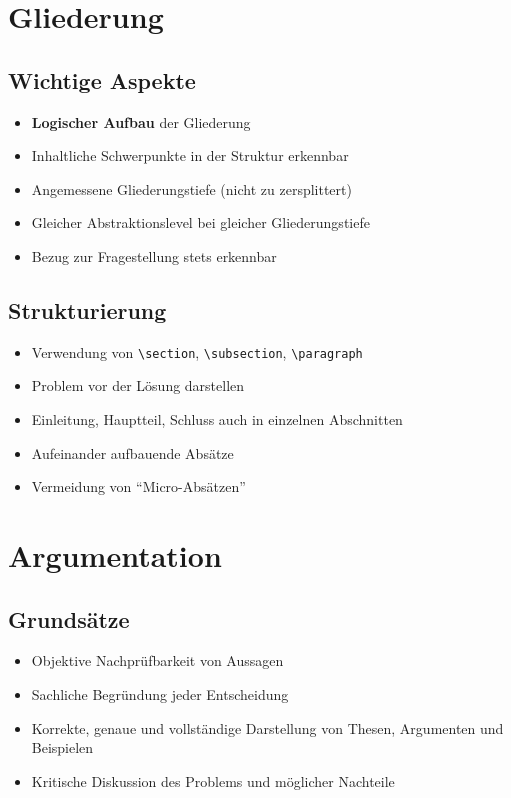 \documentclass[a4paper,12pt]{article}
\begin{document}
\section{Gliederung}

\subsection{Wichtige Aspekte}
\begin{itemize}
    \item \textbf{Logischer Aufbau} der Gliederung
    \item Inhaltliche Schwerpunkte in der Struktur erkennbar
    \item Angemessene Gliederungstiefe (nicht zu zersplittert)
    \item Gleicher Abstraktionslevel bei gleicher Gliederungstiefe
    \item Bezug zur Fragestellung stets erkennbar
\end{itemize}

\subsection{Strukturierung}
\begin{itemize}
    \item Verwendung von \verb|\section|, \verb|\subsection|, \verb|\paragraph|
    \item Problem vor der Lösung darstellen
    \item Einleitung, Hauptteil, Schluss auch in einzelnen Abschnitten
    \item Aufeinander aufbauende Absätze
    \item Vermeidung von ``Micro-Absätzen''
\end{itemize}

\section{Argumentation}

\subsection{Grundsätze}
\begin{itemize}
    \item Objektive Nachprüfbarkeit von Aussagen
    \item Sachliche Begründung jeder Entscheidung
    \item Korrekte, genaue und vollständige Darstellung von Thesen, Argumenten und Beispielen
    \item Kritische Diskussion des Problems und möglicher Nachteile
\end{itemize}
\end{document}
